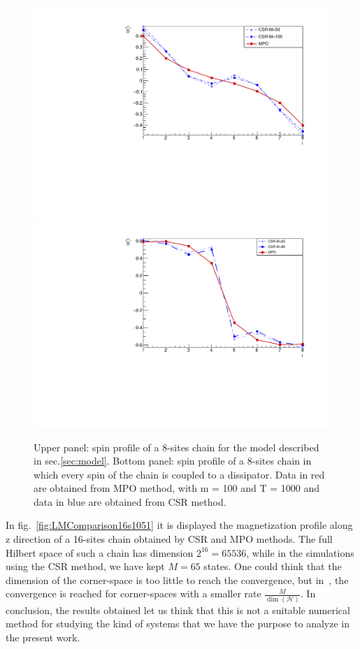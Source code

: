 \begin{figure}[H]
    \centering
    \includegraphics[scale=0.6]{Figures/8sites/1U1D_comparisonCSR_MPO_8site.pdf}
    \includegraphics[scale=0.6]{Figures/8sites/8sites_MPOvsCORNER_4U4D.pdf}
    \captionsetup{width=1.\linewidth}
    \caption{Upper panel: spin profile of a 8-sites chain for the model described in sec.\ref{sec:model}. Bottom panel: spin profile of a 8-sites chain in which every spin of the chain is coupled to a dissipator. Data in red are obtained from MPO method, with m = 100 and T = 1000 and data in blue are obtained from CSR method.}
    \label{fig:comparisonCSR_MPO_8site}
\end{figure}

In fig.~\ref{fig:LMComparison16s1051} it is displayed the magnetization profile along z direction of a 16-sites chain obtained by CSR and MPO methods. The full Hilbert space of such a chain has dimension $2^{16} = 65536$, while in the simulations using the CSR method, we have kept $M = 65$ states. One could think that the dimension of the corner-space is too little to reach the convergence, but in~\cite{PhysRevLett.115.080604}, the convergence is reached for corner-spaces with a smaller rate $\frac{M}{\dim(\mathcal{H})}$. In conclusion, the results obtained let us think that this is not a suitable numerical method for studying the kind of systems that we have the purpose to analyze in the present work.

